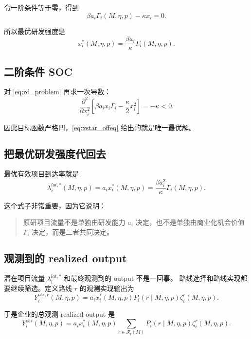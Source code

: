 \documentclass[12pt,UTF8]{ctexart}
\newcommand{\Rset}{\mathcal{R}}
\theoremstyle{plain}
\theoremstyle{remark}
\begin{document}
令一阶条件等于零，得到
\begin{equation}
\beta a_i\Gamma_i(M,\eta,p)-\kappa x_i=0.
\label{eq:foc}
\end{equation}

所以最优研发强度是
\begin{equation}
x_i^*(M,\eta,p)
=
\frac{\beta a_i}{\kappa}\Gamma_i(M,\eta,p).
\label{eq:xstar_offeq}
\end{equation}

\subsection{二阶条件 SOC}

对 \eqref{eq:rd_problem} 再求一次导数：
\[
\frac{\partial^2}{\partial x_i^2}
\left[
\beta a_i x_i \Gamma_i
-\frac{\kappa}{2}x_i^2
\right]
=
-\kappa<0.
\]

因此目标函数严格凹，\eqref{eq:xstar_offeq} 给出的就是唯一最优解。

\subsection{把最优研发强度代回去}

最优有效项目到达率就是
\begin{equation}
\lambda_i^{lat,*}(M,\eta,p)
=
a_i x_i^*(M,\eta,p)
=
\frac{\beta a_i^2}{\kappa}\Gamma_i(M,\eta,p).
\label{eq:lambda_lat_star}
\end{equation}

这个式子非常重要，因为它说明：

\begin{quote}
原研项目流量不是单独由研发能力 $a_i$ 决定，也不是单独由商业化机会价值
$\Gamma_i$ 决定，而是二者共同决定。
\end{quote}

\subsection{观测到的 realized output}

潜在项目流量 $\lambda_i^{lat,*}$ 和最终观测到的 output 不是一回事。
路线选择和路线实现都要继续筛选。定义路线 $r$ 的观测实现输出为
\begin{equation}
Y_i^{obs,r}(M,\eta,p)
=
a_i x_i^*(M,\eta,p)
P_i(r\mid M,\eta,p)
\zeta_i^r(M,\eta,p).
\label{eq:obs_route_output}
\end{equation}

于是企业的总观测 realized output 是
\begin{equation}
Y_i^{obs}(M,\eta,p)
=
a_i x_i^*(M,\eta,p)
\sum_{r\in\Rset_i(M)}
P_i(r\mid M,\eta,p)\zeta_i^r(M,\eta,p).
\label{eq:obs_total_output}
\end{equation}
\end{document}
